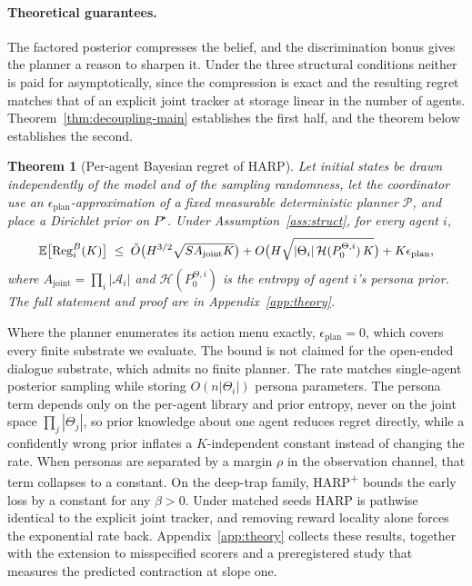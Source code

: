 \documentclass[letterpaper]{article} %
\newtheorem{theorem}{Theorem}[section]
\begin{document}
\paragraph{Theoretical guarantees.}

The factored posterior compresses the belief, and the discrimination bonus gives the planner a reason to sharpen it. Under the three structural conditions neither is paid for asymptotically, since the compression is exact and the resulting regret matches that of an explicit joint tracker at storage linear in the number of agents. Theorem~\ref{thm:decoupling-main} establishes the first half, and the theorem below establishes the second.

\begin{theorem}[Per-agent Bayesian regret of HARP]
\label{thm:regret-main}
Let initial states be drawn independently of the model and of the sampling randomness, let the coordinator use an $\epsilon_{\mathrm{plan}}$-approximation of a fixed measurable deterministic planner $\mathcal P$, and place a Dirichlet prior on $P^\star$. Under Assumption~\ref{ass:struct}, for every agent $i$,
\begin{equation}\label{eq:regret-main}\resizebox{0.9\linewidth}{!}{$\displaystyle
\mathbb E\big[\mathrm{Reg}_i^B(K)\big] \;\le\; \tilde O\big(H^{3/2}\sqrt{S A_{\mathrm{joint}} K}\big) + O\big(H\sqrt{|\Theta_i|\,\mathcal H(P_0^{\Theta,i})\,K}\big) + K\epsilon_{\mathrm{plan}}, $}
\end{equation}
where $A_{\mathrm{joint}}=\prod_i|\mathcal A_i|$ and $\mathcal H(P_0^{\Theta,i})$ is the entropy of agent $i$'s persona prior. The full statement and proof are in Appendix~\ref{app:theory}.
\end{theorem}

Where the planner enumerates its action menu exactly, $\epsilon_{\mathrm{plan}}=0$, which covers every finite substrate we evaluate. The bound is not claimed for the open-ended dialogue substrate, which admits no finite planner. The rate matches single-agent posterior sampling while storing $O(n|\Theta_i|)$ persona parameters. The persona term depends only on the per-agent library and prior entropy, never on the joint space $\prod_j|\Theta_j|$, so prior knowledge about one agent reduces regret directly, while a confidently wrong prior inflates a $K$-independent constant instead of changing the rate. When personas are separated by a margin $\rho$ in the observation channel, that term collapses to a constant. On the deep-trap family, HARP\textsuperscript{+} bounds the early loss by a constant for any $\beta>0$. Under matched seeds HARP is pathwise identical to the explicit joint tracker, and removing reward locality alone forces the exponential rate back. Appendix~\ref{app:theory} collects these results, together with the extension to misspecified scorers and a preregistered study that measures the predicted contraction at slope one.
\end{document}
